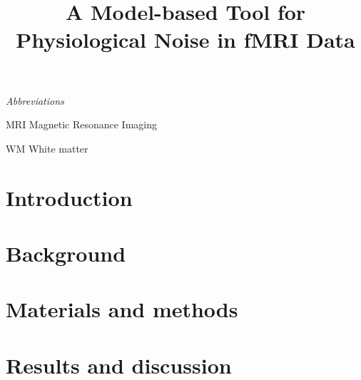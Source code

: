 \documentclass[conference]{IEEEtran}
\newcommand{\abbrlabel}[1]{\makebox[2cm][l]{\textbf{#1}\ \dotfill}}
\newenvironment{abbreviations}{\begin{list}{}{\renewcommand{\makelabel}{\abbrlabel}}}{\end{list}}
\begin{document}
\title{A Model-based Tool for Physiological Noise in fMRI Data\\}

\author{}

\maketitle

%


\textit{Abbreviations}
\begin{abbreviations}
\item[MRI] Magnetic Resonance Imaging
\item[WM] White matter
\end{abbreviations}

\section{Introduction}\label{sec:Introduction}


\section{Background}\label{sec:Background}


\section{Materials and methods}\label{sec:Methods}


\section{Results and discussion}\label{sec:Results_And_Discussion}



%
\end{document}
